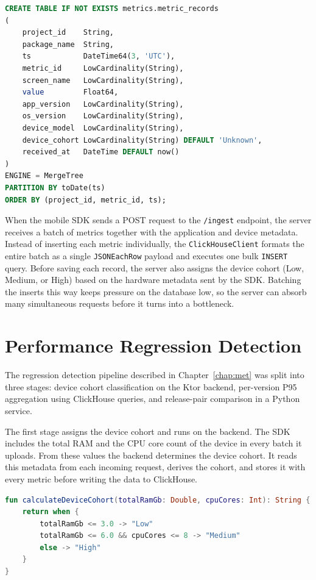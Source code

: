 \newpage

\begin{lstlisting}[language=SQL, caption={ClickHouse metric\_records table schema}]
CREATE TABLE IF NOT EXISTS metrics.metric_records
(
    project_id    String,
    package_name  String,
    ts            DateTime64(3, 'UTC'),
    metric_id     LowCardinality(String),
    screen_name   LowCardinality(String),
    value         Float64,
    app_version   LowCardinality(String),
    os_version    LowCardinality(String),
    device_model  LowCardinality(String),
    device_cohort LowCardinality(String) DEFAULT 'Unknown',
    received_at   DateTime DEFAULT now()
)
ENGINE = MergeTree
PARTITION BY toDate(ts)
ORDER BY (project_id, metric_id, ts);
\end{lstlisting}

When the mobile SDK sends a POST request to the \texttt{/ingest} endpoint, the server receives a batch of metrics together with the application and device metadata. Instead of inserting each metric individually, the \texttt{ClickHouseClient} formats the entire batch as a single \texttt{JSONEachRow} payload and executes one bulk \texttt{INSERT} query. Before saving each record, the server also assigns the device cohort (Low, Medium, or High) based on the hardware metadata sent by the SDK. Batching the inserts this way keeps pressure on the database low, so the server can absorb many simultaneous requests before it turns into a bottleneck.

\section{Performance Regression Detection}
\label{sec:regression_impl}

The regression detection pipeline described in Chapter~\ref{chap:met} was split into three stages: device cohort classification on the Ktor backend, per-version P95 aggregation using ClickHouse queries, and release-pair comparison in a Python service.

The first stage assigns the device cohort and runs on the backend. The SDK includes the total RAM and the CPU core count of the device in every batch it uploads. From these values the backend determines the device cohort. It reads this metadata from each incoming request, derives the cohort, and stores it with every metric before writing the data to ClickHouse.

\begin{lstlisting}[language=Kotlin, caption={Device cohort classification}]
fun calculateDeviceCohort(totalRamGb: Double, cpuCores: Int): String {
    return when {
        totalRamGb <= 3.0 -> "Low"
        totalRamGb <= 6.0 && cpuCores <= 8 -> "Medium"
        else -> "High"
    }
}
\end{lstlisting}

